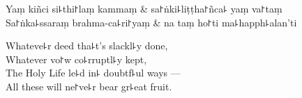 \begin{twochants}
  Yaṃ kiñci si꜕thi꜓laṃ kammaṃ & sa꜓ṅki꜕liṭṭha꜓ñca꜕ yaṃ va꜓taṃ \\
  Sa꜓ṅka꜕ssaraṃ brahma-ca꜕ri꜓yaṃ & na taṃ ho꜓ti ma꜕happh꜕alan'ti \\
\end{twochants}

\begin{english}
  Whateve꜕r deed tha꜕t's slackl꜕y done,\\
  Whatever vo꜓w co꜕rruptl꜕y kept,\\
  The Holy Life le꜕d in꜕ doubtf꜕ul ways ---\\
  All these will ne꜓ve꜕r bear gr꜕eat fruit.
\end{english}


